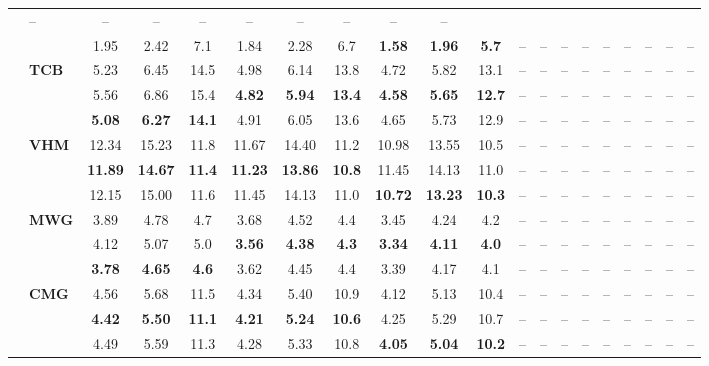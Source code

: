 \begin{table}[!t]
\begin{tabular*}{\textwidth}{@{\extracolsep{\fill}}llccc|ccc|ccc|ccc|ccc|ccc@{}}
  & -- & -- & -- & -- & -- & -- & -- & -- & -- \\
& 
  & 1.95 & 2.42 & 7.1 & 1.84 & 2.28 & 6.7 & \textbf{1.58} & \textbf{1.96} & \textbf{5.7}
  & -- & -- & -- & -- & -- & -- & -- & -- & -- \\
& \multirow{3}{*}{\textbf{TCB}} 
  & 5.23 & 6.45 & 14.5 & 4.98 & 6.14 & 13.8 & 4.72 & 5.82 & 13.1
  & -- & -- & -- & -- & -- & -- & -- & -- & -- \\
& 
  & 5.56 & 6.86 & 15.4 & \textbf{4.82} & \textbf{5.94} & \textbf{13.4} & \textbf{4.58} & \textbf{5.65} & \textbf{12.7}
  & -- & -- & -- & -- & -- & -- & -- & -- & -- \\
& 
  & \textbf{5.08} & \textbf{6.27} & \textbf{14.1} & 4.91 & 6.05 & 13.6 & 4.65 & 5.73 & 12.9
  & -- & -- & -- & -- & -- & -- & -- & -- & -- \\
& \multirow{3}{*}{\textbf{VHM}} 
  & 12.34 & 15.23 & 11.8 & 11.67 & 14.40 & 11.2 & 10.98 & 13.55 & 10.5
  & -- & -- & -- & -- & -- & -- & -- & -- & -- \\
& 
  & \textbf{11.89} & \textbf{14.67} & \textbf{11.4} & \textbf{11.23} & \textbf{13.86} & \textbf{10.8} & 11.45 & 14.13 & 11.0
  & -- & -- & -- & -- & -- & -- & -- & -- & -- \\
& 
  & 12.15 & 15.00 & 11.6 & 11.45 & 14.13 & 11.0 & \textbf{10.72} & \textbf{13.23} & \textbf{10.3}
  & -- & -- & -- & -- & -- & -- & -- & -- & -- \\
& \multirow{3}{*}{\textbf{MWG}} 
  & 3.89 & 4.78 & 4.7 & 3.68 & 4.52 & 4.4 & 3.45 & 4.24 & 4.2
  & -- & -- & -- & -- & -- & -- & -- & -- & -- \\
& 
  & 4.12 & 5.07 & 5.0 & \textbf{3.56} & \textbf{4.38} & \textbf{4.3} & \textbf{3.34} & \textbf{4.11} & \textbf{4.0}
  & -- & -- & -- & -- & -- & -- & -- & -- & -- \\
& 
  & \textbf{3.78} & \textbf{4.65} & \textbf{4.6} & 3.62 & 4.45 & 4.4 & 3.39 & 4.17 & 4.1
  & -- & -- & -- & -- & -- & -- & -- & -- & -- \\
& \multirow{3}{*}{\textbf{CMG}} 
  & 4.56 & 5.68 & 11.5 & 4.34 & 5.40 & 10.9 & 4.12 & 5.13 & 10.4
  & -- & -- & -- & -- & -- & -- & -- & -- & -- \\
& 
  & \textbf{4.42} & \textbf{5.50} & \textbf{11.1} & \textbf{4.21} & \textbf{5.24} & \textbf{10.6} & 4.25 & 5.29 & 10.7
  & -- & -- & -- & -- & -- & -- & -- & -- & -- \\
& 
  & 4.49 & 5.59 & 11.3 & 4.28 & 5.33 & 10.8 & \textbf{4.05} & \textbf{5.04} & \textbf{10.2}
  & -- & -- & -- & -- & -- & -- & -- & -- & -- \\

\end{tabular*}
\end{table}
